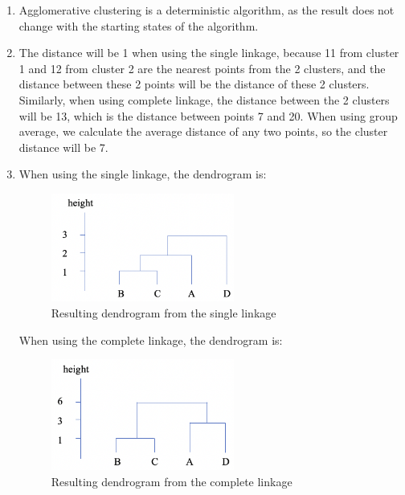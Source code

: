 \begin{enumerate}
\item Agglomerative clustering is a deterministic algorithm, as the result does not change with the starting states of the algorithm.  \\

\item The distance will be 1 when using the single linkage, because 11 from cluster 1 and 12 from cluster 2 are the nearest points from the 2 clusters, and the distance between these 2 points will be the distance of these 2 clusters. Similarly, when using complete linkage, the distance between the 2 clusters will be 13, which is the distance between points 7 and 20. When using group average, we calculate the average distance of any two points, so the cluster distance will be 7. \\

\item When using the single linkage, the dendrogram is:
\begin{figure}[htp]
\centering
\captionsetup{justification=centering}
\includegraphics[width=6cm]{"Part 3 - Learning Systems/Unsupervised Learning/Hierarchical Clustering/figures/AnswerQ3-single.png"}
\caption{Resulting dendrogram from the single linkage}
\label{fig:Q3-single}
\end{figure}

When using the complete linkage, the dendrogram is:
\begin{figure}[htp]
\centering
\captionsetup{justification=centering}
\includegraphics[width=6cm]{"Part 3 - Learning Systems/Unsupervised Learning/Hierarchical Clustering/figures/AnswerQ3-complete.png"}
\caption{Resulting dendrogram from the complete linkage}
\label{fig:Q3-complete}
\end{figure}


\end{enumerate}
